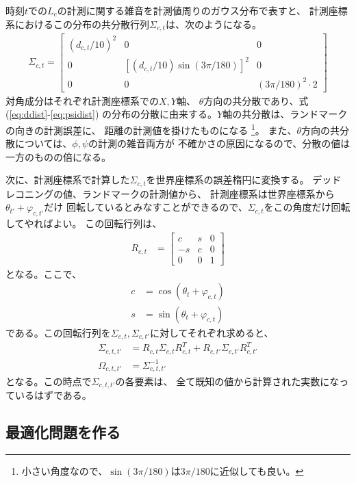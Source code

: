 時刻$t$での$L_c$の計測に関する雑音を計測値周りのガウス分布で表すと、
計測座標系におけるこの分布の共分散行列$\Sigma_{c,t}$は、次のようになる。
\begin{align}
	\Sigma_{c,t} =
	\begin{bmatrix}
	(d_{c,t}/10)^2 & 0 & 0 \\
	0 & [(d_{c,t}/10)\sin(3\pi/180)]^2 & 0 \\
	0 & 0 & (3\pi/180)^2\cdot 2
	\end{bmatrix}
\end{align}
対角成分はそれぞれ計測座標系での$X,Y$軸、
$\theta$方向の共分散であり、式(\ref{eq:ddist}-\ref{eq:psidist})
の分布の分散に由来する。$Y$軸の共分散は、ランドマークの向きの計測誤差に、
距離の計測値を掛けたものになる
\footnote{小さい角度なので、$\sin(3\pi/180)$は$3\pi/180$に近似しても良い。}。
また、$\theta$方向の共分散については、$\phi,\psi$の計測の雑音両方が
不確かさの原因になるので、分散の値は一方のものの倍になる。

次に、計測座標系で計算した$\Sigma_{c,t}$を世界座標系の誤差楕円に変換する。
デッドレコニングの値、ランドマークの計測値から、
計測座標系は世界座標系から$\theta_{t'} + \varphi_{c,t'}$だけ
回転しているとみなすことができるので、$\Sigma_{c,t}$をこの角度だけ回転してやればよい。
この回転行列は、
\begin{align}
	R_{c,t} &=
	\begin{bmatrix}
	c & s  & 0 \\
	-s & c & 0 \\
	0 & 0 & 1
	\end{bmatrix}
\end{align}
となる。ここで、
\begin{align}
	c &= \cos(\theta_{t} + \varphi_{c,t}) \nonumber \\
	s &= \sin(\theta_{t} + \varphi_{c,t}) \nonumber 
\end{align}
である。この回転行列を$\Sigma_{c,t}, \Sigma_{c,t'}$に対してそれぞれ求めると、
\begin{align}
	\Sigma_{c,t,t'} &= R_{c,t}\Sigma_{c,t}R_{c,t}^T + R_{c,t'}\Sigma_{c,t'}R_{c,t'}^T \\
	\Omega_{c,t,t'} &= \Sigma_{c,t,t'}^{-1}
\end{align}
となる。この時点で$\Sigma_{c,t,t'}$の各要素は、
全て既知の値から計算された実数になっているはずである。

\subsection{最適化問題を作る}


